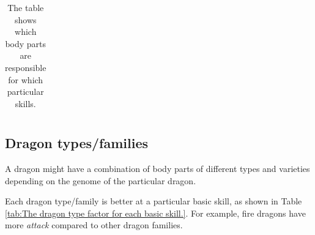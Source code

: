 \documentclass[12pt]{article}
\begin{document}
\begin{table}[!ht]
\begin{tabular}{p{0.84in}p{0.84in}p{0.84in}p{0.84in}p{0.84in}p{0.84in}}
\end{tabular}\caption{The table shows which body parts are responsible for which particular skills.}
\label{tab:The table shows which body parts are responsible for which particular skills.}

 \end{table}




\subsection{Dragon types/families}
\label{Dragon types/families}  \par

A dragon might have a combination of body parts of different types and varieties depending on the genome of the particular dragon.\par

Each dragon type/family is better at a particular basic skill, as shown in  Table \ref{tab:The dragon type factor for each basic skill.}. For example, fire dragons have more \textit{attack} compared to other dragon families.\par



\end{document}
